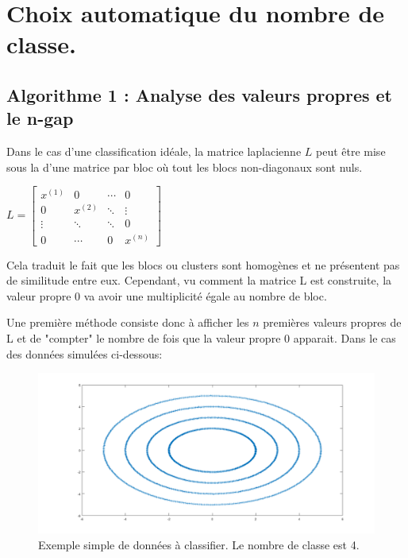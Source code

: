 \chapter{Choix automatique du nombre de classe.}

\section{Algorithme 1 : Analyse des valeurs propres et le n-gap}

Dans le cas d'une classification idéale, la matrice laplacienne $L$ peut être mise sous la d'une matrice par bloc où tout les blocs non-diagonaux sont nuls.

\medskip

$
L = 
\begin{bmatrix}
   x^{(1)} &0 &\cdots &0 \\
   0 &x^{(2)} &\ddots &\vdots\\
   \vdots &\ddots &\ddots &0\\
   0 &\cdots &0 &x^{(n)}
\end{bmatrix}
$

\medskip

Cela traduit le fait que les blocs ou clusters sont homogènes et ne présentent pas de similitude entre eux. Cependant, vu comment la matrice L est construite, la valeur propre 0 va avoir une multiplicité égale au nombre de bloc.

\medskip

Une première méthode consiste donc à afficher les $n$ premières valeurs propres de L et de "compter" le nombre de fois que la valeur propre 0 apparait. Dans le cas des données simulées ci-dessous:

\medskip

\begin{figure}[H]
\centering
    \includegraphics[scale=0.4,angle=0]{Images/testData.png}
    \caption{Exemple simple de données à classifier. Le nombre de classe est 4.}
    \label{fig:testData}
\end{figure} 

